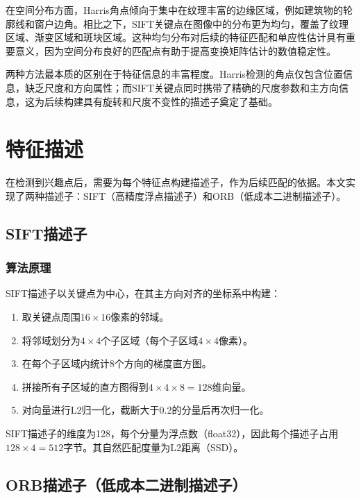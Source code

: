 \documentclass[12pt]{article}
\begin{document}
在空间分布方面，Harris角点倾向于集中在纹理丰富的边缘区域，例如建筑物的轮廓线和窗户边角。相比之下，SIFT关键点在图像中的分布更为均匀，覆盖了纹理区域、渐变区域和斑块区域。这种均匀分布对后续的特征匹配和单应性估计具有重要意义，因为空间分布良好的匹配点有助于提高变换矩阵估计的数值稳定性。

两种方法最本质的区别在于特征信息的丰富程度。Harris检测的角点仅包含位置信息，缺乏尺度和方向属性；而SIFT关键点同时携带了精确的尺度参数和主方向信息，这为后续构建具有旋转和尺度不变性的描述子奠定了基础。


\section{特征描述}

在检测到兴趣点后，需要为每个特征点构建描述子，作为后续匹配的依据。本文实现了两种描述子：SIFT（高精度浮点描述子）和ORB（低成本二进制描述子）。

\subsection{SIFT描述子}

\subsubsection{算法原理}

SIFT描述子以关键点为中心，在其主方向对齐的坐标系中构建：
\begin{enumerate}
    \item 取关键点周围$16\times16$像素的邻域。
    \item 将邻域划分为$4\times4$个子区域（每个子区域$4\times4$像素）。
    \item 在每个子区域内统计8个方向的梯度直方图。
    \item 拼接所有子区域的直方图得到$4\times4\times8 = 128$维向量。
    \item 对向量进行L2归一化，截断大于0.2的分量后再次归一化。
\end{enumerate}

SIFT描述子的维度为128，每个分量为浮点数（float32），因此每个描述子占用$128\times4 = 512$字节。其自然匹配度量为L2距离（SSD）。

\subsection{ORB描述子（低成本二进制描述子）}
\end{document}
